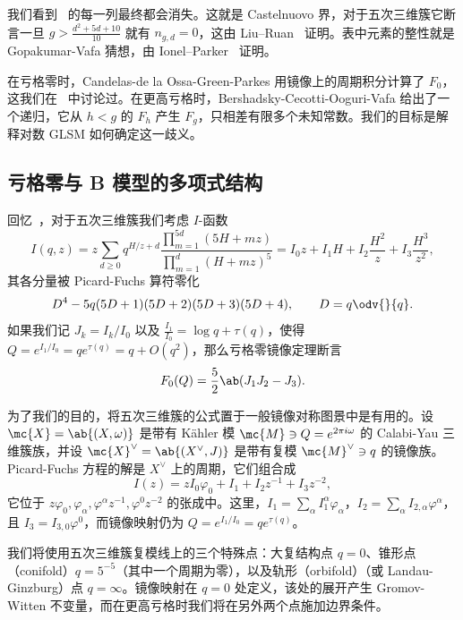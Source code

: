 我们看到~ 的每一列最终都会消失。这就是 Castelnuovo 界，对于五次三维簇它断言一旦 \(g > \frac{d^2+5d+10}{10}\) 就有 \(n_{g,d} = 0\)，这由 Liu--Ruan~\cite{LiuRuanCastelnuovo} 证明。表中元素的整性就是 Gopakumar-Vafa 猜想，由 Ionel--Parker~\cite{IonelParker2018} 证明。

在亏格零时，Candelas-de la Ossa-Green-Parkes 用镜像上的周期积分计算了 \(F_0\)，这我们在~ 中讨论过。在更高亏格时，Bershadsky-Cecotti-Ooguri-Vafa 给出了一个递归，它从 \(h < g\) 的 \(F_h\) 产生 \(F_g\)，只相差有限多个未知常数。我们的目标是解释对数 GLSM 如何确定这一歧义。

\subsection{亏格零与 B 模型的多项式结构}%
\label{sub:Genus zero and the polynomial structure of the B-model}

回忆~，对于五次三维簇我们考虑 \(I\)-函数
\[
    I(q,z) = z\sum_{d \geq 0} q^{H/z+d} \frac{\prod_{m=1}^{5d}(5H+mz)}{\prod_{m=1}^d (H+mz)^5} = I_0 z + I_1 H + I_2 \frac{H^2}{z} + I_3 \frac{H^3}{z^2},
\]
其各分量被 Picard-Fuchs 算符零化
\[ D^4 - 5q(5D+1)(5D+2)(5D+3)(5D+4), \qquad D = q \odv{}{q}. \]
如果我们记 \(J_k = I_k/I_0\) 以及 \(\frac{I_1}{I_0} = \log q + \tau(q)\)，使得 \(Q = e^{I_1/I_0} = qe^{\tau(q)} = q + O(q^2)\)，那么亏格零镜像定理断言
\[ F_0(Q) = \frac{5}{2}\ab(J_1 J_2 - J_3). \]

为了我们的目的，将五次三维簇的公式置于一般镜像对称图景中是有用的。设 \(\mc{X} = \ab\{(X,\omega)\}\) 是带有 Kähler 模 \(\mc{M} \ni Q = e^{2\pi i \omega}\) 的 Calabi-Yau 三维簇族，并设 \(\mc{X}^{\vee} = \ab\{(X^{\vee},J)\}\) 是带有复模 \(\mc{M}^{\vee} \ni q\) 的镜像族。Picard-Fuchs 方程的解是 \(X^{\vee}\) 上的周期，它们组合成
\[ I(z) = zI_0\varphi_0 + I_1 + I_2 z^{-1} + I_3 z^{-2}, \]
它位于 \(z\varphi_0, \varphi_{\alpha}, \varphi^{\alpha}z^{-1}, \varphi^0 z^{-2}\) 的张成中。这里，\(I_1 = \sum_{\alpha} I_1^{\alpha}\varphi_{\alpha}\)，\(I_2 = \sum_{\alpha} I_{2,\alpha}\varphi^{\alpha}\)，且 \(I_3 = I_{3,0}\varphi^0\)，而镜像映射仍为 \(Q = e^{I_1/I_0} = qe^{\tau(q)}\)。

我们将使用五次三维簇复模线上的三个特殊点：大复结构点 \(q=0\)、锥形点（conifold）\(q = 5^{-5}\)（其中一个周期为零），以及轨形（orbifold）（或 Landau-Ginzburg）点 \(q = \infty\)。镜像映射在 \(q=0\) 处定义，该处的展开产生 Gromov-Witten 不变量，而在更高亏格时我们将在另外两个点施加边界条件。

